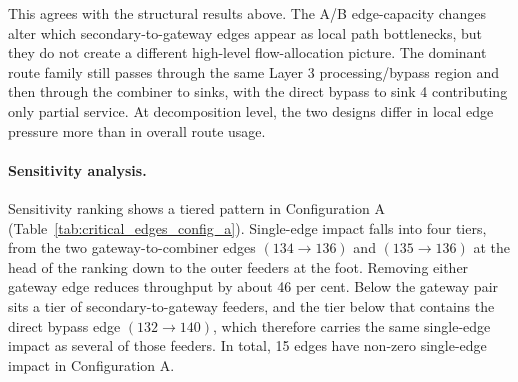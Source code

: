 \documentclass[12pt]{report}
\begin{document}
This agrees with the structural results above. The A/B edge-capacity changes alter which secondary-to-gateway edges appear as local path bottlenecks, but they do not create a different high-level flow-allocation picture. The dominant route family still passes through the same Layer 3 processing/bypass region and then through the combiner to sinks, with the direct bypass to sink 4 contributing only partial service. At decomposition level, the two designs differ in local edge pressure more than in overall route usage.

\paragraph{Sensitivity analysis.}

Sensitivity ranking shows a tiered pattern in Configuration A (Table~\ref{tab:critical_edges_config_a}). Single-edge impact falls into four tiers, from the two gateway-to-combiner edges $(134\to136)$ and $(135\to136)$ at the head of the ranking down to the outer feeders at the foot. Removing either gateway edge reduces throughput by about 46 per cent. Below the gateway pair sits a tier of secondary-to-gateway feeders, and the tier below that contains the direct bypass edge $(132\to140)$, which therefore carries the same single-edge impact as several of those feeders. In total, 15 edges have non-zero single-edge impact in Configuration A.
\end{document}
